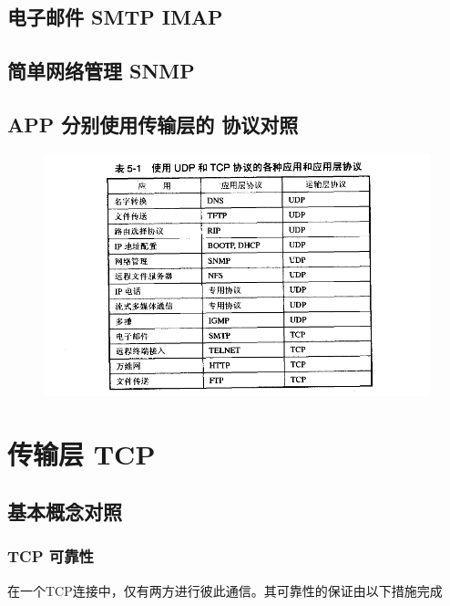 \documentclass[UTF8,a4paper,8pt]{ctexbook}
\begin{document}
		\subsection{电子邮件 SMTP IMAP}	
		
		\subsection{简单网络管理 SNMP}
		
		\subsection{APP 分别使用传输层的 协议对照}
			\begin{figure}[h]
				\centering
				\includegraphics[scale = 0.7]{App-Proposal.png}
			\end{figure}
		
	\section{传输层 TCP}		
		\subsection{基本概念对照} 
			\subsubsection{TCP 可靠性}
				在一个TCP连接中，仅有两方进行彼此通信。其可靠性的保证由以下措施完成
				
\end{document}
